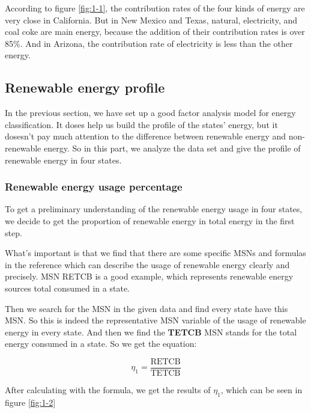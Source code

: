 \documentclass[a4paper,11pt]{article}
\begin{document}
\par According to figure \ref{fig:1-1}, the contribution rates of the four kinds of energy are very close in California. But in New Mexico and Texas, natural, electricity, and coal coke are main energy, because the addition of their contribution rates is over 85\%. And in Arizona, the contribution rate of electricity is less than the other energy. 

\subsection{Renewable energy profile}

\par In the previous section, we have set up a good factor analysis model for energy classification. It doses help us build the profile of the states' energy, but it dosesn't pay much attention to the difference between renewable energy and non-renewable energy. So in this part, we analyze the data set and give the profile of renewable energy in four states.

\subsubsection{Renewable energy usage percentage}
\par To get a preliminary understanding of the renewable energy usage in four states, we decide to get the proportion of renewable energy in total energy in the first step.

\par What's important is that we find that there are some specific MSNs and formulas in the reference \cite{4} which can describe the usage of renewable energy clearly and precisely. MSN RETCB is a good example, which represents renewable energy sources total consumed in a state.
\par Then we search for the MSN in the given data and find every state have this MSN. 
So this is indeed the representative MSN variable of the usage of renewable energy in every state. And then we find the \textbf{TETCB} MSN stands for the total energy consumed in a state. So we get the equation:

\begin{equation}
    \eta_1=\frac{\text{RETCB}}{\text{TETCB}}
\end{equation}

\par After calculating with the formula, we get the results of $\eta_1$, which can be seen in figure \ref{fig:1-2}
\end{document}
